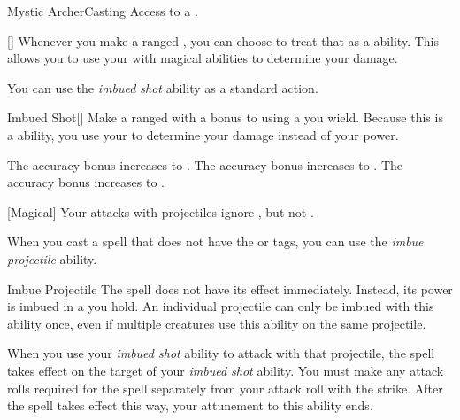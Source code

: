     \begin{feat}{Mystic Archer}{Casting}
        \featpre Access to a .

        [] Whenever you make a ranged , you can choose to treat that as a  ability.
        This allows you to use your  with magical abilities to determine your damage.

         You can use the \textit{imbued shot} ability as a standard action.
        \begin{freeability}{Imbued Shot}[]
            Make a ranged  with a  bonus to  using a  you wield.
            Because this is a  ability, you use your   to determine your damage instead of your  power.

            \rankline
             The accuracy bonus increases to .
             The accuracy bonus increases to .
             The accuracy bonus increases to .
        \end{freeability}

        [Magical] Your attacks with projectiles ignore , but not .

         When you cast a spell that does not have the  or  tags,
            you can use the \textit{imbue projectile} ability.
        \begin{attuneability}{Imbue Projectile}
            \rankline
            The spell does not have its effect immediately.
            Instead, its power is imbued in a  you hold.
            An individual projectile can only be imbued with this ability once, even if multiple creatures use this ability on the same projectile.

            When you use your \textit{imbued shot} ability to attack with that projectile, the spell takes effect on the target of your \textit{imbued shot} ability.
            You must make any attack rolls required for the spell separately from your attack roll with the strike.
            After the spell takes effect this way, your attunement to this ability ends.
        \end{attuneability}


\end{feat}
